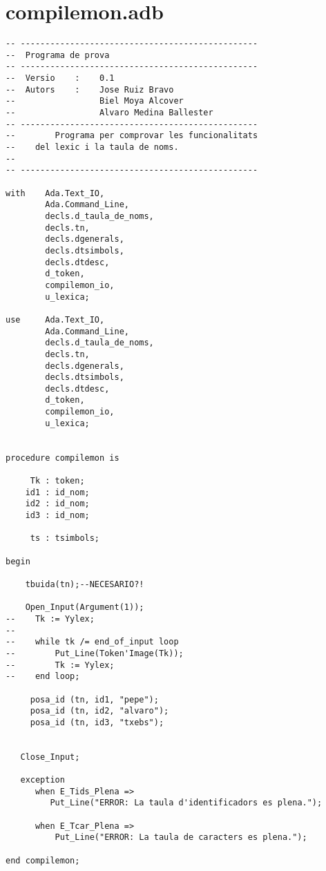 \documentclass[10pt]{report}
\begin{document}
    \section{compilemon.adb}
    \begin{lstlisting}[style=Ada]
-- ------------------------------------------------
--  Programa de prova
-- ------------------------------------------------
--  Versio    :    0.1
--  Autors    :    Jose Ruiz Bravo
--                 Biel Moya Alcover
--                 Alvaro Medina Ballester
-- ------------------------------------------------
--        Programa per comprovar les funcionalitats
--    del lexic i la taula de noms.
--
-- ------------------------------------------------

with    Ada.Text_IO,
        Ada.Command_Line,
        decls.d_taula_de_noms,
        decls.tn,
        decls.dgenerals,
        decls.dtsimbols,
        decls.dtdesc,
        d_token,
        compilemon_io,
        u_lexica;
        
use     Ada.Text_IO,
        Ada.Command_Line,
        decls.d_taula_de_noms,
        decls.tn,
        decls.dgenerals,
        decls.dtsimbols,
        decls.dtdesc,
        d_token,
        compilemon_io,
        u_lexica;
        

procedure compilemon is

     Tk : token;
    id1 : id_nom;
    id2 : id_nom;
    id3 : id_nom;
    
     ts : tsimbols;
    
begin

    tbuida(tn);--NECESARIO?!

    Open_Input(Argument(1));
--    Tk := Yylex;
--    
--    while tk /= end_of_input loop
--        Put_Line(Token'Image(Tk));
--        Tk := Yylex;
--    end loop;

     posa_id (tn, id1, "pepe");
     posa_id (tn, id2, "alvaro");
     posa_id (tn, id3, "txebs");
     
   
   Close_Input;
   
   exception
      when E_Tids_Plena => 
         Put_Line("ERROR: La taula d'identificadors es plena.");
         
      when E_Tcar_Plena =>
          Put_Line("ERROR: La taula de caracters es plena.");

end compilemon;
    \end{lstlisting}
    
\end{document}

